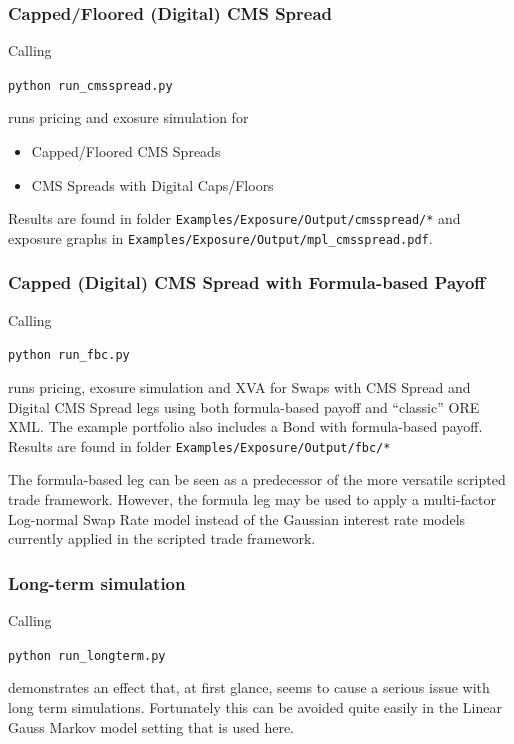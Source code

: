 \subsubsection{Capped/Floored (Digital) CMS Spread}\label{example:exposure_cmsspread}

Calling

\medskip
\centerline{\tt python run\_cmsspread.py }
\medskip

runs pricing and exosure simulation for
\begin{itemize}
\item Capped/Floored CMS Spreads
\item CMS Spreads with Digital Caps/Floors
\end{itemize}

Results are found in folder {\tt Examples/Exposure/Output/cmsspread/*} and exposure graphs in {\tt Examples/Exposure/Output/mpl\_cmsspread.pdf}.

\subsubsection{Capped (Digital) CMS Spread with Formula-based Payoff}\label{example:exposure_fbc}

Calling

\medskip
\centerline{\tt python run\_fbc.py }
\medskip

runs pricing, exosure simulation and XVA for Swaps with CMS Spread and
Digital CMS Spread legs using both formula-based payoff and ``classic'' ORE XML.
The example portfolio also includes a Bond with formula-based payoff.
Results are found in folder {\tt Examples/Exposure/Output/fbc/*}

The formula-based leg can be seen as a predecessor of the more versatile
scripted trade framework. However, the formula leg may be used to
apply a multi-factor Log-normal Swap Rate model instead of the Gaussian
interest rate models currently applied in the scripted trade framework.

\subsubsection{Long-term simulation}\label{example:exposure_longterm}

Calling

\medskip
\centerline{\tt python run\_longterm.py }
\medskip

demonstrates an effect that, at first glance, seems to cause a serious issue with long term simulations.
Fortunately this can be avoided quite easily in the Linear Gauss Markov model setting
that is used here. \\

